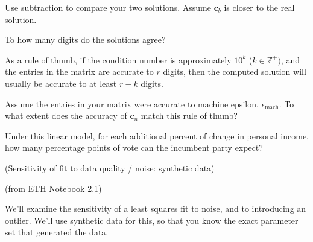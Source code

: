 \documentclass[12pt,letterpaper,noanswers]{exam}
\makeatletter
\newcommand{\mathbf}[1]{\boldsymbol{#1}}
\newcommand{\pyf}{%
  \begingroup\catcode`_=12
  \pyf@
}
\newcommand{\pyf@}[1]{\texttt{#1}\endgroup}
\makeatother
\begin{document}
\begin{questions}
\begin{parts}
\item Use subtraction to compare your two solutions.  Assume $\overline{\mathbf{c}}_b$ is closer to the real solution.

To how many digits do the solutions agree?

As a rule of thumb, if the condition number is approximately $10^k$ ($k\in\mathbb{Z}^+)$, and the entries in the matrix are accurate to $r$ digits, then the computed solution will usually be accurate to at least $r-k$ digits.

Assume the entries in your matrix were accurate to machine epsilon, $\epsilon_{\text{mach}}$.  To what extent does the accuracy of $\overline{\mathbf{c}}_n$ match this rule of thumb?

\item Under this linear model, for each additional percent of change in personal income, how many percentage points of vote can the incumbent party expect?
\end{parts}



\question (Sensitivity of fit to data quality / noise: synthetic data)

(from ETH Notebook 2.1)

We'll examine the sensitivity of a least squares fit to noise, and to introducing an outlier.  We'll use synthetic data for this, so that you know the exact parameter set that generated the data.

 
\end{questions}
\end{document}
